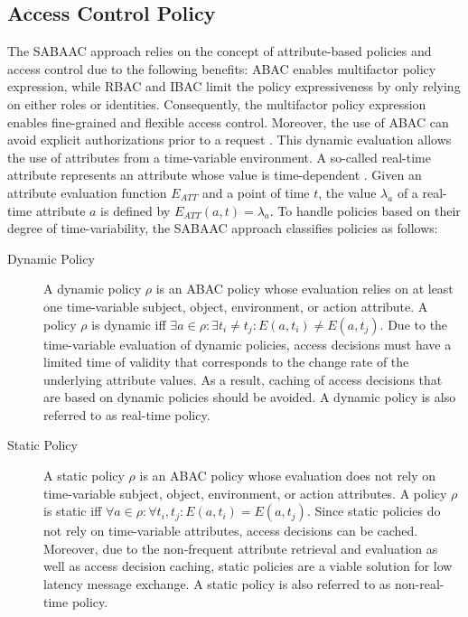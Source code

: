 \subsection{Access Control Policy}
\label{sec:approach:sabaac:policy}
The SABAAC approach relies on the concept of attribute-based policies and access control due to the following benefits:
ABAC enables multifactor policy expression, while RBAC and IBAC limit the policy expressiveness by only relying on either roles or identities.
Consequently, the multifactor policy expression enables fine-grained and flexible access control.
Moreover, the use of ABAC can avoid explicit authorizations prior to a request \cite{Hu2014}.
This dynamic evaluation allows the use of attributes from a time-variable environment.
A so-called real-time attribute represents an attribute whose value is time-dependent \cite{Burmester2013}.
Given an attribute evaluation function $E_{ATT}$ and a point of time $t$, the value $\lambda_a$ of a real-time attribute $a$ is defined by $E_{ATT}(a, t) = \lambda_a$.
To handle policies based on their degree of time-variability, the SABAAC approach classifies policies as follows:
\begin{description}
    \item[Dynamic Policy] A dynamic policy $\rho$ is an ABAC policy whose evaluation relies on at least one time-variable subject, object, environment, or action attribute.
    A policy $\rho$ is dynamic iff $\exists a \in \rho: \exists t_i \neq t_j: E(a,t_i) \neq E(a,t_j)$.
    Due to the time-variable evaluation of dynamic policies, access decisions must have a limited time of validity that corresponds to the change rate of the underlying attribute values.
    As a result, caching of access decisions that are based on dynamic policies should be avoided.
    A dynamic policy is also referred to as real-time policy.
    \item[Static Policy] A static policy $\rho$ is an ABAC policy whose evaluation does not rely on time-variable subject, object, environment, or action attributes.
    A policy $\rho$ is static iff $\forall a \in \rho: \forall t_i,t_j: E(a,t_i) = E(a,t_j)$.
    Since static policies do not rely on time-variable attributes, access decisions can be cached.
    Moreover, due to the non-frequent attribute retrieval and evaluation as well as access decision caching, static policies are a viable solution for low latency message exchange.
    A static policy is also referred to as non-real-time policy.
\end{description}

